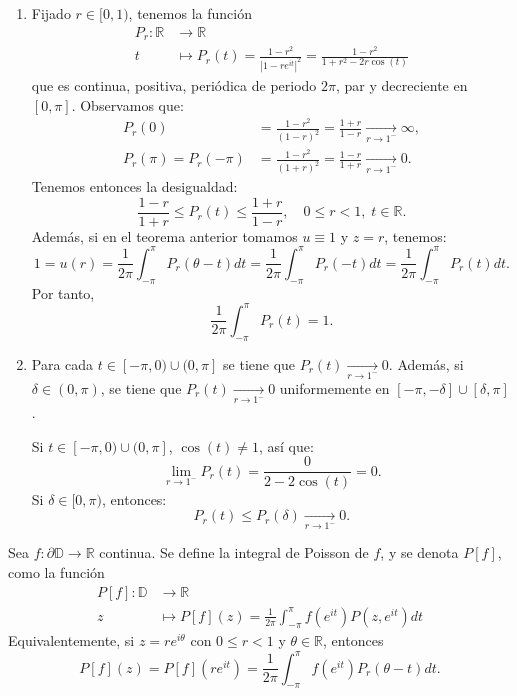 \begin{properties}
\begin{enumerate}
        \item Fijado $r \in [0, 1)$, tenemos la función
              \begin{align*}
                  P_r: \mathbb{R} & \to \mathbb{R}                                                               \\
                  t               & \mapsto P_r(t) = \frac{1-r^2}{|1-re^{it}|^2} = \frac{1-r^2}{1+r^2-2r\cos(t)}
              \end{align*}
              que es continua, positiva, periódica de periodo $2\pi$, par y decreciente en $[0, \pi]$.
              Observamos que:
              \begin{align*}
                  P_r(0)               & = \frac{1-r^2}{(1-r)^2} = \frac{1+r}{1-r} \xrightarrow[r \to 1^-]{} \infty, \\
                  P_r(\pi) = P_r(-\pi) & = \frac{1-r^2}{(1+r)^2} = \frac{1-r}{1+r} \xrightarrow[r \to 1^-]{} 0.
              \end{align*}
              Tenemos entonces la desigualdad:
              $$\frac{1-r}{1+r} \leq P_r(t) \leq \frac{1+r}{1-r}, \quad 0 \leq r < 1, \; t \in \mathbb{R}.$$
              Además, si en el teorema anterior tomamos $u \equiv 1$ y $z = r$, tenemos:
              $$1 = u(r) = \frac{1}{2\pi} \int_{-\pi}^\pi P_r(\theta - t)dt = \frac{1}{2\pi} \int_{-\pi}^\pi P_r(-t)dt = \frac{1}{2\pi} \int_{-\pi}^\pi P_r(t)dt.$$
              Por tanto,
              $$\frac{1}{2\pi} \int_{-\pi}^\pi P_r(t) = 1.$$

        \item Para cada $t \in [-\pi, 0) \cup (0, \pi]$ se tiene que $P_r(t) \xrightarrow[r \to 1^-]{} 0$.
              Además, si $\delta \in (0, \pi)$, se tiene que $P_r(t) \xrightarrow[r \to 1^-]{} 0$ uniformemente en $[-\pi, -\delta] \cup [\delta, \pi]$.

              Si $t \in [-\pi, 0) \cup (0, \pi]$, $\cos(t) \neq 1$, así que:
              $$\lim_{r \to 1^-} P_r(t) = \frac{0}{2-2\cos(t)} = 0.$$
              Si $\delta \in [0, \pi)$, entonces:
              $$P_r(t) \leq P_r(\delta) \xrightarrow[r \to 1^-]{} 0.$$
    \end{enumerate}
\end{properties}

\begin{definition}
    Sea $f: \partial\mathbb{D} \to \mathbb{R}$ continua.
    Se define la integral de Poisson de $f$, y se denota $P[f]$, como la función
    \begin{align*}
        P[f]: \mathbb{D} & \to \mathbb{R}                                                           \\
        z                & \mapsto P[f](z) = \frac{1}{2\pi} \int_{-\pi}^\pi f(e^{it})P(z, e^{it})dt
    \end{align*}
    Equivalentemente, si $z = re^{i\theta}$ con $0 \leq r < 1$ y $\theta \in \mathbb{R}$, entonces
    $$P[f](z) = P[f](re^{it}) = \frac{1}{2\pi} \int_{-\pi}^\pi f(e^{it})P_r(\theta - t)dt.$$
\end{definition}


